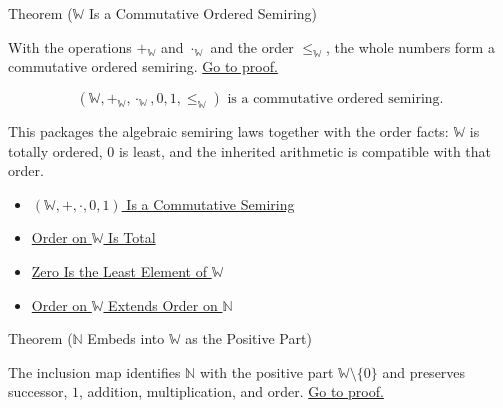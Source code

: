 \begin{theorembox}{Theorem (\texorpdfstring{$\mathbb{W}$}{W} Is a Commutative Ordered Semiring)}
\begin{theorem}
\label{thm:w-commutative-ordered-semiring}
With the operations $+_{\mathbb{W}}$ and $\cdot_{\mathbb{W}}$ and the order
$\le_{\mathbb{W}}$, the whole numbers form a commutative ordered semiring.
\hyperref[prf:w-commutative-ordered-semiring]{Go to proof.}
\end{theorem}
\end{theorembox}

\begin{remark*}
\[
(\mathbb{W},+_{\mathbb{W}},\cdot_{\mathbb{W}},0,1,\le_{\mathbb{W}})
\text{ is a commutative ordered semiring}.
\]
\end{remark*}

\begin{remark*}[Interpretation]
This packages the algebraic semiring laws together with the order facts:
$\mathbb{W}$ is totally ordered, $0$ is least, and the inherited arithmetic is
compatible with that order.
\end{remark*}

\begin{dependencies}
\begin{itemize}
  \item \hyperref[thm:w-commutative-semiring]{$(\mathbb{W},+,\cdot,0,1)$ Is a Commutative Semiring}
  \item \hyperref[thm:order-on-w-total]{Order on $\mathbb{W}$ Is Total}
  \item \hyperref[thm:zero-least-element-of-w]{Zero Is the Least Element of $\mathbb{W}$}
  \item \hyperref[thm:order-on-w-extends-order-on-n]{Order on $\mathbb{W}$ Extends Order on $\mathbb{N}$}
\end{itemize}
\end{dependencies}

\begin{theorembox}{Theorem (\texorpdfstring{$\mathbb{N}$}{N} Embeds into \texorpdfstring{$\mathbb{W}$}{W} as the Positive Part)}
\begin{theorem}
\label{thm:n-embeds-into-w-as-positive-part}
The inclusion map identifies $\mathbb{N}$ with the positive part
$\mathbb{W}\setminus\{0\}$ and preserves successor, $1$, addition,
multiplication, and order.
\hyperref[prf:n-embeds-into-w-as-positive-part]{Go to proof.}
\end{theorem}
\end{theorembox}

